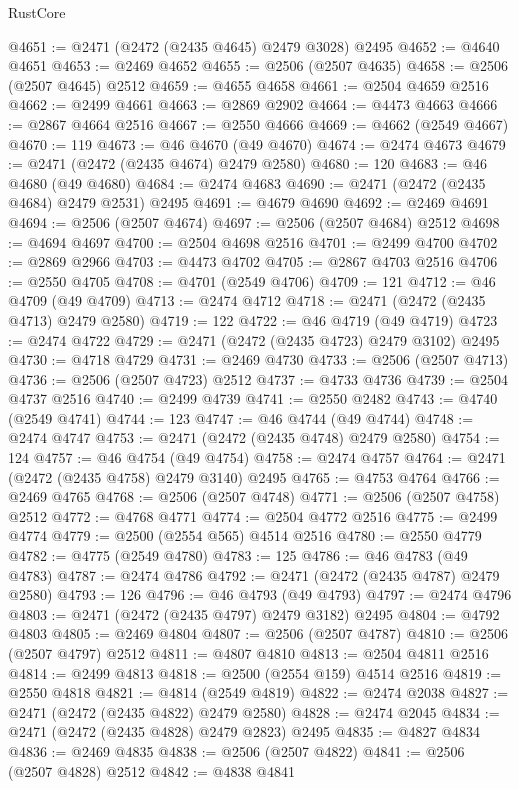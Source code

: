 \begin{lexlean}{RustCore}
\begin{coremodule}
@4651 := @2471 (@2472 (@2435 @4645) @2479 @3028) @2495
@4652 := @4640 @4651
@4653 := @2469 @4652
@4655 := @2506 (@2507 @4635)
@4658 := @2506 (@2507 @4645) @2512
@4659 := @4655 @4658
@4661 := @2504 @4659 @2516
@4662 := @2499 @4661
@4663 := @2869 @2902
@4664 := @4473 @4663
@4666 := @2867 @4664 @2516
@4667 := @2550 @4666
@4669 := @4662 (@2549 @4667)
@4670 := 119
@4673 := @46 @4670 (@49 @4670)
@4674 := @2474 @4673
@4679 := @2471 (@2472 (@2435 @4674) @2479 @2580)
@4680 := 120
@4683 := @46 @4680 (@49 @4680)
@4684 := @2474 @4683
@4690 := @2471 (@2472 (@2435 @4684) @2479 @2531) @2495
@4691 := @4679 @4690
@4692 := @2469 @4691
@4694 := @2506 (@2507 @4674)
@4697 := @2506 (@2507 @4684) @2512
@4698 := @4694 @4697
@4700 := @2504 @4698 @2516
@4701 := @2499 @4700
@4702 := @2869 @2966
@4703 := @4473 @4702
@4705 := @2867 @4703 @2516
@4706 := @2550 @4705
@4708 := @4701 (@2549 @4706)
@4709 := 121
@4712 := @46 @4709 (@49 @4709)
@4713 := @2474 @4712
@4718 := @2471 (@2472 (@2435 @4713) @2479 @2580)
@4719 := 122
@4722 := @46 @4719 (@49 @4719)
@4723 := @2474 @4722
@4729 := @2471 (@2472 (@2435 @4723) @2479 @3102) @2495
@4730 := @4718 @4729
@4731 := @2469 @4730
@4733 := @2506 (@2507 @4713)
@4736 := @2506 (@2507 @4723) @2512
@4737 := @4733 @4736
@4739 := @2504 @4737 @2516
@4740 := @2499 @4739
@4741 := @2550 @2482
@4743 := @4740 (@2549 @4741)
@4744 := 123
@4747 := @46 @4744 (@49 @4744)
@4748 := @2474 @4747
@4753 := @2471 (@2472 (@2435 @4748) @2479 @2580)
@4754 := 124
@4757 := @46 @4754 (@49 @4754)
@4758 := @2474 @4757
@4764 := @2471 (@2472 (@2435 @4758) @2479 @3140) @2495
@4765 := @4753 @4764
@4766 := @2469 @4765
@4768 := @2506 (@2507 @4748)
@4771 := @2506 (@2507 @4758) @2512
@4772 := @4768 @4771
@4774 := @2504 @4772 @2516
@4775 := @2499 @4774
@4779 := @2500 (@2554 @565) @4514 @2516
@4780 := @2550 @4779
@4782 := @4775 (@2549 @4780)
@4783 := 125
@4786 := @46 @4783 (@49 @4783)
@4787 := @2474 @4786
@4792 := @2471 (@2472 (@2435 @4787) @2479 @2580)
@4793 := 126
@4796 := @46 @4793 (@49 @4793)
@4797 := @2474 @4796
@4803 := @2471 (@2472 (@2435 @4797) @2479 @3182) @2495
@4804 := @4792 @4803
@4805 := @2469 @4804
@4807 := @2506 (@2507 @4787)
@4810 := @2506 (@2507 @4797) @2512
@4811 := @4807 @4810
@4813 := @2504 @4811 @2516
@4814 := @2499 @4813
@4818 := @2500 (@2554 @159) @4514 @2516
@4819 := @2550 @4818
@4821 := @4814 (@2549 @4819)
@4822 := @2474 @2038
@4827 := @2471 (@2472 (@2435 @4822) @2479 @2580)
@4828 := @2474 @2045
@4834 := @2471 (@2472 (@2435 @4828) @2479 @2823) @2495
@4835 := @4827 @4834
@4836 := @2469 @4835
@4838 := @2506 (@2507 @4822)
@4841 := @2506 (@2507 @4828) @2512
@4842 := @4838 @4841

\end{coremodule}
\end{lexlean}
